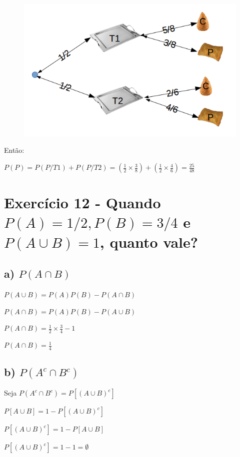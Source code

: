 \documentclass[12pt]{article}
\begin{document}
\begin{figure}[H]
\centering\includegraphics[width=0.6\paperwidth]{coxinha.png}
\end{figure}

Então:

$\displaystyle P(P)=P(P/T1)+P(P/T2)=(\frac{1}{2} \times \frac{3}{8})+(\frac{1}{2} \times \frac{4}{6})=\frac{25}{48}$

\section*{Exercício 12 - Quando $P(A)=1/2, P(B)=3/4$ e $P(A \cup B)=1$, quanto vale?}

\subsection*{a) $P(A \cap B)$}

$\displaystyle P(A \cup B)=P(A)P(B)-P(A \cap B)$

$\displaystyle P(A \cap B)=P(A)P(B)-P(A \cup B)$

$\displaystyle P(A \cap B)=\frac{1}{2} \times \frac{3}{4} - 1$

$\displaystyle P(A \cap B)=\frac{1}{4}$

\subsection*{b) $P(A^c \cap B^c)$}

Seja $P(A^c \cap B^c) = P[(A \cup B)^c]$

$\displaystyle  P[A \cup B] = 1 -  P[(A \cup B)^c]$

$\displaystyle  P[(A \cup B)^c] = 1 - P[A \cup B]$

$\displaystyle P[(A \cup B)^c] = 1 - 1 = \emptyset$
\end{document}
